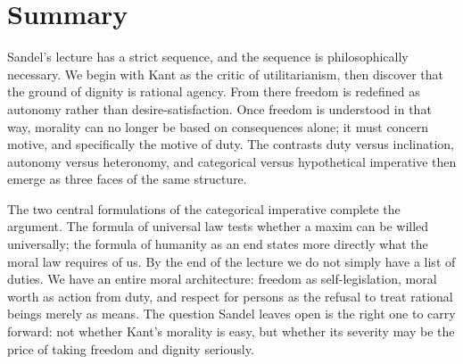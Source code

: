 \section{Summary}

Sandel's lecture has a strict sequence, and the sequence is philosophically necessary. We begin with Kant as the critic of utilitarianism, then discover that the ground of dignity is rational agency. From there freedom is redefined as autonomy rather than desire-satisfaction. Once freedom is understood in that way, morality can no longer be based on consequences alone; it must concern motive, and specifically the motive of duty. The contrasts duty versus inclination, autonomy versus heteronomy, and categorical versus hypothetical imperative then emerge as three faces of the same structure.

The two central formulations of the categorical imperative complete the argument. The formula of universal law tests whether a maxim can be willed universally; the formula of humanity as an end states more directly what the moral law requires of us. By the end of the lecture we do not simply have a list of duties. We have an entire moral architecture: freedom as self-legislation, moral worth as action from duty, and respect for persons as the refusal to treat rational beings merely as means. The question Sandel leaves open is the right one to carry forward: not whether Kant's morality is easy, but whether its severity may be the price of taking freedom and dignity seriously.